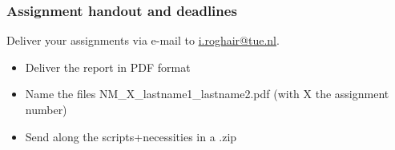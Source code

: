\documentclass[11pt,table,final,fleqn,xcolor={usenames,dvipsnames}]{beamer}
\begin{document}
%

%
\begin{frame}
 \frametitle{Assignment handout and deadlines}
     Deliver your assignments via e-mail to \href{mailto:i.roghair@tue.nl}{i.roghair@tue.nl}.
    \begin{itemize}
    	\item Deliver the report in PDF format
    	\item Name the files NM\_X\_lastname1\_lastname2.pdf (with X the assignment number)
    	\item Send along the scripts+necessities in a .zip
    \end{itemize}
\end{frame}
\end{document}
